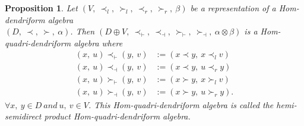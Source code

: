 \documentclass[11pt,twoside,reqno]{amsart}
\theoremstyle{plain}
\newtheorem{proposition}[thm]{Proposition}
\theoremstyle{definition}
\begin{document}
\begin{proposition}\label{rpro}
Let $(V ,\  \prec_l ,\  \succ_l,\   \prec_r ,\ \succ_r  ,\ \beta)$ be a representation of a Hom-dendriform algebra \\
$(D  ,\ \prec  ,\ \succ  ,\ \alpha)$. Then 
$(D \oplus V,\ \prec_\vdash,\  \prec_\dashv,\  \succ_\vdash,\  \succ_\dashv,\  \alpha \otimes \beta)$
is a Hom-quadri-dendriform algebra where 
\begin{align*}
(x ,\ u) \prec_\vdash (y ,\  v) &:= (x \prec y ,\ x \prec_l v)  \\
(x ,\ u) \prec_\dashv (y ,\  v) &:= (x \prec y ,\ u \prec_r y)  \\
(x ,\ u) \succ_\vdash (y ,\  v) &:= (x \succ y ,\ x \succ_l v)  \\
(x ,\ u) \succ_\dashv (y ,\  v) &:= (x \succ y ,\ u \succ_r y) .
\end{align*}
$\forall x,\ y \in D \ and\ u ,\ v \in V$. This Hom-quadri-dendriform algebra is called the hemi-semidirect product Hom-quadri-dendriform algebra.
\end{proposition}
\end{document}
